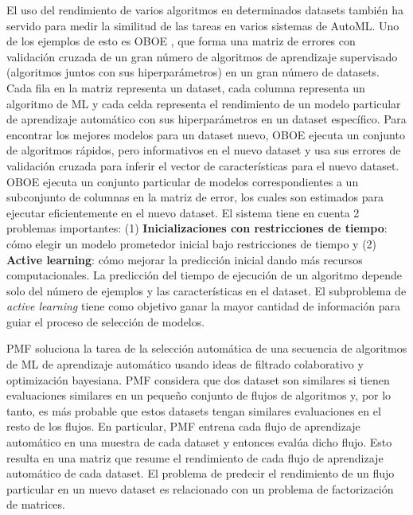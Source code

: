 El uso del rendimiento de varios algoritmos en determinados datasets también ha servido para medir la similitud de las tareas en varios sistemas de AutoML. Uno de los ejemplos de esto es OBOE \cite{yang2018oboe}, que forma una matriz de errores con validación cruzada de un gran número de algoritmos de aprendizaje supervisado (algoritmos juntos con sus hiperparámetros) en un gran número de datasets. Cada fila  en la matriz representa un dataset, cada columna representa un algoritmo de ML y cada celda representa el rendimiento de un modelo particular de aprendizaje automático con sus hiperparámetros en un dataset específico. Para encontrar los mejores modelos para un dataset nuevo, OBOE ejecuta un conjunto de algoritmos rápidos, pero informativos en el nuevo dataset y usa sus errores de validación cruzada para inferir el vector de características para el nuevo dataset. 
OBOE ejecuta un conjunto particular de modelos correspondientes a un subconjunto de columnas en la matriz de error, los cuales son estimados para ejecutar eficientemente en el nuevo dataset. El sistema tiene en cuenta 2 problemas importantes: (1) \textbf{Inicializaciones con restricciones de tiempo}: cómo elegir un modelo prometedor inicial bajo restricciones de tiempo y (2) \textbf{Active learning}: cómo mejorar la predicción inicial dando más recursos computacionales. La predicción del tiempo de ejecución de un algoritmo depende solo del número de ejemplos y las características en el dataset. El subproblema de \textit{active learning} tiene como objetivo ganar la mayor cantidad de información para guiar el proceso de selección de modelos.

PMF \cite{fusi2018advances} soluciona la tarea de la selección automática de una secuencia de algoritmos de ML de aprendizaje automático usando ideas de filtrado colaborativo y optimización bayesiana. PMF considera que dos dataset son similares si tienen evaluaciones similares en un pequeño conjunto de flujos de algoritmos y, por lo tanto, es más probable que estos datasets tengan similares evaluaciones en el resto de los flujos. En particular, PMF entrena cada flujo de aprendizaje automático en una muestra de cada dataset y entonces evalúa dicho flujo. Esto resulta en una matriz que resume el rendimiento de cada flujo de aprendizaje automático de cada dataset. El problema de predecir el rendimiento de un flujo particular en un nuevo dataset es relacionado con un problema de factorización de matrices.

